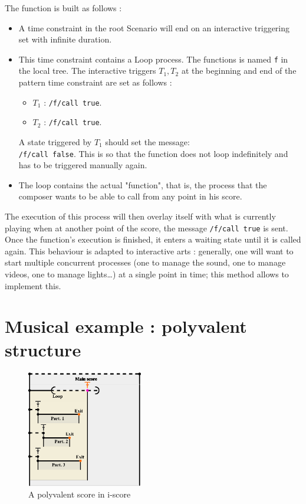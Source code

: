 \documentclass{article}
\begin{document}
The function is built as follows : 
\begin{itemize}
    \item A time constraint in the root Scenario will end on an interactive triggering set with infinite duration.
    \item This time constraint contains a Loop process. 
    The functions is named \lstinline{f} in the local tree. The interactive triggers $T_1, T_2$ at the beginning and end of the pattern time constraint are set as follows : 
    \begin{itemize}
        \item $T_1$ : \lstinline{/f/call true}.
        \item $T_2$ : \lstinline{/f/call true}.
    \end{itemize}
    A state triggered by $T_1$ should set the message:~\\
    \lstinline{/f/call false}. This is so that the function does not loop 
    indefinitely and has to be triggered manually again.
    \item The loop contains the actual "function", that is, the process that the composer wants to be able to call from any point in his score. 
\end{itemize}

The execution of this process will then overlay itself with what is currently playing when at another point of the score, 
the message \lstinline{/f/call true} is sent.
Once the function's execution is finished, it enters a waiting state until it is called again.
This behaviour is adapted to interactive arts : generally, one will want to start multiple 
concurrent processes (one to manage the sound, one to manage videos, one to manage lights\dots) at a single point in time; this method allows to implement this.

\section{Musical example : polyvalent structure}
\begin{figure}
    \centering
    \includegraphics[width=0.45\textwidth]{images/partition.eps}
    \caption{A polyvalent score in i-score}
    \label{fig.polyvalent}
\end{figure}
\end{document}
